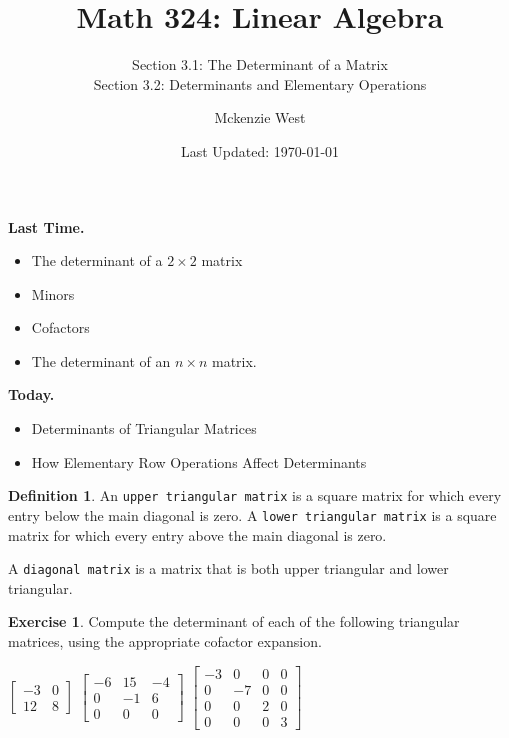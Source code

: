 \documentclass{beamer}
\newcommand{\fn}{\insertframenumber}
\theoremstyle{definition}
\newtheorem{exercise}{Exercise}
\newtheorem*{defn}{Definition}
\renewcommand{\emph}[1]{{\color{blue}\texttt{#1}}}
\begin{document}
	\title{Math 324: Linear Algebra}
	\subtitle{Section 3.1: The Determinant of a Matrix\\Section 3.2: Determinants and Elementary Operations}
	\author{Mckenzie West}
	\date{Last Updated: \today}
\begin{frame}
\maketitle
\end{frame}

\begin{frame}{\insertframenumber}
	\begin{block}{\textbf{Last Time.}}
	\begin{itemize}[label=--]
		\item The determinant of a $2\times 2$ matrix
		\item Minors
		\item Cofactors
		\item The determinant of an $n\times n$ matrix.
	\end{itemize}
	\end{block}
	\begin{block}{\textbf{Today.}}
		\begin{itemize}[label=--]
			\item Determinants of Triangular Matrices
			\item How Elementary Row Operations Affect Determinants
		\end{itemize}
	\end{block}
\end{frame}
\begin{frame}{\fn}
	\begin{defn}
		An \emph{upper triangular matrix} is a square matrix for which every entry below the main diagonal is zero.  A \emph{lower triangular matrix} is a square matrix for which every entry above the main diagonal is zero.
		
		A \emph{diagonal matrix} is a matrix that is both upper triangular and lower triangular.
	\end{defn}
	\begin{exercise}
		Compute the determinant of each of the following triangular matrices, using the appropriate cofactor expansion.
		
				 $\begin{bmatrix}
					-3 & 0  \\
					12 & 8 
					\end{bmatrix}$
				\hfill $\begin{bmatrix}
					-6 & 15 & -4 \\
					0 & -1 & 6 \\
					0 & 0 & 0
					\end{bmatrix}$
				\hfill $\begin{bmatrix}
					-3 & 0 & 0 &0 \\
					0 & -7 &0 & 0 \\
					0 & 0 & 2 & 0 \\
					0 & 0 & 0 & 3
					\end{bmatrix}$
	\end{exercise}
\end{frame}
\end{document}
